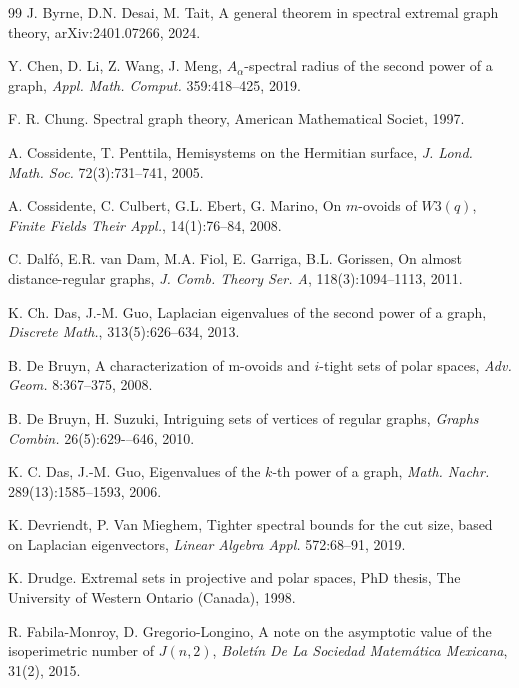 \documentclass[a4paper,11pt]{article}
\theoremstyle{definition}
\newcommand{\marrow}{\marginpar[\hfill$\longrightarrow$]{$\longleftarrow$}}
\newcommand{\niceremarkcolor}[4]{\textcolor{#4}{\textsc{#1 #2:} \marrow\textsf{#3}}}
\newcommand{\jim}[2][says]{\niceremarkcolor{Jim}{#1}{#2}{Green}}
\begin{document}
\begin{thebibliography}{99}
J. Byrne, D.N. Desai, M. Tait, A general theorem in spectral extremal graph theory,
arXiv:2401.07266, 2024.
 

 Y. Chen, D. Li, Z. Wang, J. Meng, $A_{\alpha}$-spectral radius of the second power of a graph, \emph{Appl. Math. Comput.} 359:418--425, 2019.

 F. R. Chung. Spectral graph theory, American Mathematical Societ, 1997.

 A. Cossidente, T. Penttila, Hemisystems on the Hermitian surface, \emph{J. Lond. Math. Soc.} 72(3):731--741, 2005.

 A. Cossidente, C. Culbert, G.L. Ebert, G. Marino, On $m$-ovoids of $W3 (q)$, \emph{Finite Fields Their Appl.}, 14(1):76--84, 2008.

 C. Dalf\'o, E.R. van Dam, M.A. Fiol, E. Garriga, B.L. Gorissen, On almost distance-regular graphs, \emph{J. Comb. Theory Ser. A}, 118(3):1094--1113, 2011.

K. Ch. Das, J.-M. Guo, Laplacian eigenvalues of the second power of a graph, \emph{Discrete Math.}, 313(5):626--634, 2013.

 B. De Bruyn, A characterization of m-ovoids and $i$-tight sets of polar spaces, \emph{Adv.
Geom.} 8:367–375, 2008.

B. De Bruyn, H. Suzuki, Intriguing sets of vertices of regular graphs, \emph{Graphs Combin.} 26(5):629-–646, 2010.


 K. C. Das, J.-M. Guo, Eigenvalues of the $k$-th power of a graph, \emph{Math. Nachr.} 289(13):1585--1593, 2006.


 K. Devriendt, P. Van Mieghem, Tighter spectral bounds for the cut size, based on Laplacian eigenvectors, \emph{Linear Algebra Appl.} 572:68--91, 2019.

 K. Drudge. Extremal sets in projective and polar spaces, PhD thesis, The University of Western Ontario (Canada), 1998.

 R. Fabila-Monroy, D. Gregorio-Longino, A note on the asymptotic value of the isoperimetric number of $J(n,2)$, \emph{Boletín De La Sociedad Matemática Mexicana}, 31(2), 2015.


\end{thebibliography}
\end{document}
